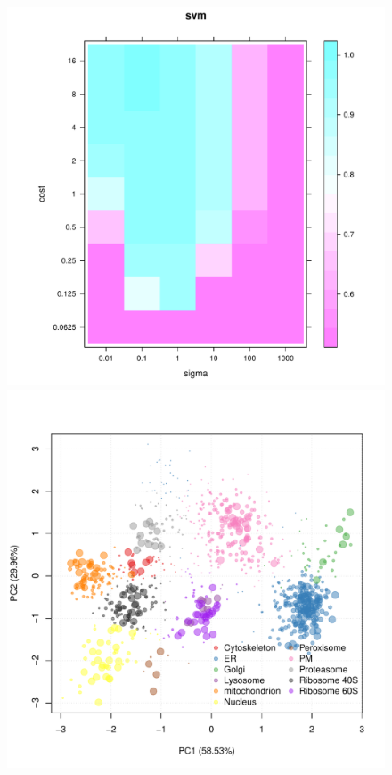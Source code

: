 \documentclass[final]{beamer}\usepackage[]{graphicx}\usepackage[]{color}
\begin{document}
\begin{frame}[fragile]
\begin{columns}
\begin{column}{.48\textwidth}
\begin{figure}[ht]
  \begin{minipage}[t]{0.45\textwidth}
    \includegraphics[width=1\textwidth]{./figures/opt1.pdf}
  \end{minipage}
  \hfill
  \begin{minipage}[t]{0.53\textwidth}
    \includegraphics{./figures/svm.pdf}
  \end{minipage}
\end{figure}


\end{column}
\end{columns}
\end{frame}
\end{document}
